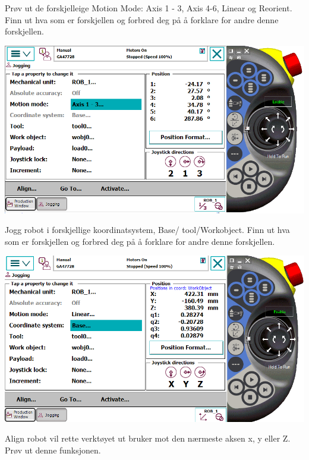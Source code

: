\vspace{1cm}

Prøv ut de forskjelleige Motion Mode: Axis 1 - 3, Axis 4-6, Linear og Reorient. Finn ut hva som er forskjellen og forbred deg på å forklare for andre denne forskjellen. 

\vspace{1cm}

\includegraphics[width=1\textwidth]{i04861x03}

\vspace{1cm}

Jogg robot i forskjellige koordinatsystem, Base/ tool/Workobject. Finn ut hva som er forskjellen og forbred deg på å forklare for andre denne forskjellen. 

\vspace{1cm}

\includegraphics[width=1\textwidth]{i04861x04}

\vspace{1cm}

Align robot vil rette verktøyet ut bruker mot den nærmeste aksen x, y eller Z. Prøv ut denne funksjonen. 

